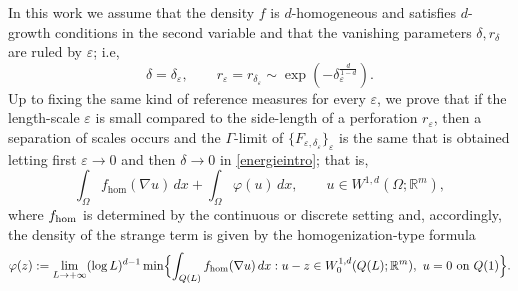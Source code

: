 \documentclass{article}
\theoremstyle{plain}
\theoremstyle{definition}
\def\e{\varepsilon}
\numberwithin{equation}{section}
\begin{document}
In this work we assume that the density $f$ is $d$-homogeneous and satisfies $d$-growth conditions in the second variable and that the vanishing parameters $\delta, r_\delta$ are ruled by $\e$; i.e, 
\begin{equation*}
 \delta=\delta_\e, \qquad r_\e=r_{\delta_\e}\sim\exp(
-\delta_\e^{\frac{d}{1-d}}).
\end{equation*} 
Up to fixing the same kind of reference measures for every $\e$, we prove that if the length-scale $\e$ is small compared to the side-length of a perforation $r_{\e}$, then a separation of scales occurs and the $\Gamma$-limit of $\{F_{\e,\delta_\e}\}_\e$ is the same that is obtained letting first $\e\to0$ and then $\delta\to0$ in \eqref{energieintro}; that is, 
\begin{equation}\label{limitintro}
\int_\Omega f_{\hom}(\nabla u)\,dx
+
\int_\Omega\varphi(u)\,dx, \qquad u\in W^{1,d}(\Omega;\mathbb R^m),
\end{equation}
where $f_{\rm hom}$  is determined by the continuous or discrete setting and, accordingly, the density of the strange term is given by the homogenization-type formula
\begin{equation}\label{phiintro}
\varphi(z)
:=
\lim_{L\to+\infty}
(\log L)^{d-1}
\min\Bigl\{
\int_{Q(L)}f_{\hom}(\nabla u)\,dx:
u-z\in W^{1,d}_0(Q(L);\mathbb R^m),
\ u=0\text{ on }Q(1)
\Bigr\}.
\end{equation}
\end{document}
